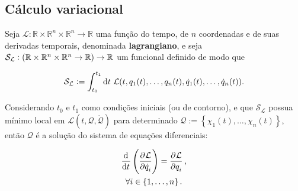 \subsection{Cálculo variacional}
\label{ssec:variational_calculus}

Seja $\mathcal{L} : \mathbb{R} \times \mathbb{R}^n \times \mathbb{R}^n
\rightarrow \mathbb{R}$ uma função do tempo, de $n$ coordenadas e de suas
derivadas temporais, denominada \textbf{lagrangiano}, e seja
$\mathcal{S}_\mathcal{L} : \del{\mathbb{R} \times \mathbb{R}^n \times
\mathbb{R}^n \rightarrow \mathbb{R}} \rightarrow \mathbb{R}$ um funcional
definido de modo que

\begin{equation*}
    \mathcal{S}_\mathcal{L} := \int_{t_0}^{t_1} \dif t~\mathcal{L}(t, q_1(t),
    \ldots, q_n(t), \dot q_1(t), \ldots, \dot q_n(t)) \text{.}
\end{equation*}

Considerando $t_0$ e $t_1$ como condições iniciais (ou de contorno), e que
$\mathcal{S}_\mathcal{L}$ possua mínimo local em $\mathcal{L}(t, \mathcal{Q},
\dot{\mathcal{Q}})$ para determinado $\mathcal{Q} := \left\{\chi_1(t), \ldots,
\chi_n(t) \right\}$, então $\mathcal{Q}$ é a solução do sistema de equações
diferenciais:

\begin{namedeq}
    \begin{gather*}
        \label{eq:lagrange}
        \dod{}{t} \del{ \dpd{\mathcal{L}}{\dot q_i} } = \dpd{\mathcal{L}}{q_i}
        \text{,} \\
        \forall i \in \left\{1, \ldots, n\right\} \text{.}
    \end{gather*}
\end{namedeq}



